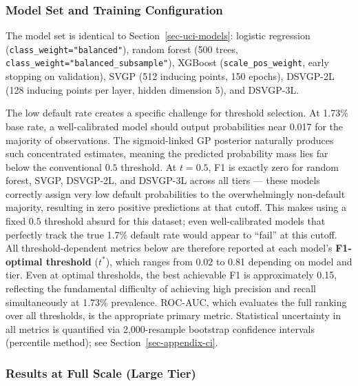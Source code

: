 \documentclass[
  letterpaper,
  DIV=11,
  numbers=noendperiod]{scrartcl}
\begin{document}
\subsubsection{Model Set and Training
Configuration}\label{sec-fm-models}

The model set is identical to Section~\ref{sec-uci-models}: logistic
regression (\texttt{class\_weight="balanced"}), random forest (500
trees, \texttt{class\_weight="balanced\_subsample"}), XGBoost
(\texttt{scale\_pos\_weight}, early stopping on validation), SVGP (512
inducing points, 150 epochs), DSVGP-2L (128 inducing points per layer,
hidden dimension 5), and DSVGP-3L.

The low default rate creates a specific challenge for threshold
selection. At 1.73\% base rate, a well-calibrated model should output
probabilities near 0.017 for the majority of observations. The
sigmoid-linked GP posterior naturally produces such concentrated
estimates, meaning the predicted probability mass lies far below the
conventional \(0.5\) threshold. At \(t = 0.5\), F1 is exactly zero for
random forest, SVGP, DSVGP-2L, and DSVGP-3L across all tiers --- these
models correctly assign very low default probabilities to the
overwhelmingly non-default majority, resulting in zero positive
predictions at that cutoff. This makes using a fixed \(0.5\) threshold
absurd for this dataset; even well-calibrated models that perfectly
track the true 1.7\% default rate would appear to ``fail'' at this
cutoff. All threshold-dependent metrics below are therefore reported at
each model's \textbf{F1-optimal threshold} (\(t^*\)), which ranges from
0.02 to 0.81 depending on model and tier. Even at optimal thresholds,
the best achievable F1 is approximately 0.15, reflecting the fundamental
difficulty of achieving high precision and recall simultaneously at
1.73\% prevalence. ROC-AUC, which evaluates the full ranking over all
thresholds, is the appropriate primary metric. Statistical uncertainty
in all metrics is quantified via 2,000-resample bootstrap confidence
intervals (percentile method); see Section~\ref{sec-appendix-ci}.

\subsubsection{Results at Full Scale (Large Tier)}\label{sec-fm-large}
\end{document}
